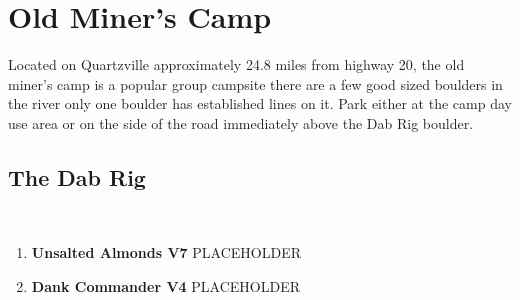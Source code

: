 \section{Old Miner's Camp}\label{sa:Old Miner's Camp}
Located on Quartzville approximately 24.8 miles from highway 20, the old miner's camp is a popular group campsite there are a few good sized boulders in the river only one boulder has established lines on it. Park either at the camp day use area or on the side of the road immediately above the Dab Rig boulder.
\subsection*{The Dab Rig}\label{bf:The Dab Rig}
\

\begin{enumerate}[]
	\item\label{rt:Unsalted Almonds} \colorbox{Goldenrod!50}{\textbf{Unsalted Almonds V7  } }
	\newline PLACEHOLDER\
	\item\label{rt:Dank Commander} \colorbox{RoyalBlue!20}{\textbf{Dank Commander V4  } }
	\newline PLACEHOLDER\
\end{enumerate}
\clearpage